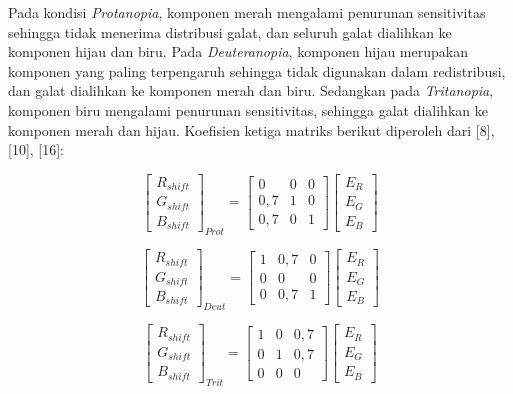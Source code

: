 Pada kondisi \textit{Protanopia}, komponen merah mengalami penurunan sensitivitas sehingga tidak menerima distribusi galat, dan seluruh galat dialihkan ke komponen hijau dan biru. Pada \textit{Deuteranopia}, komponen hijau merupakan komponen yang paling terpengaruh sehingga tidak digunakan dalam redistribusi, dan galat dialihkan ke komponen merah dan biru. Sedangkan pada \textit{Tritanopia}, komponen biru mengalami penurunan sensitivitas, sehingga galat dialihkan ke komponen merah dan hijau. Koefisien ketiga matriks berikut diperoleh dari [8], [10], [16]:

\begin{equation}
\begin{bmatrix} R_{shift} \\ G_{shift} \\ B_{shift} \end{bmatrix}_{Prot} =
\begin{bmatrix} 0 & 0 & 0 \\ 0{,}7 & 1 & 0 \\ 0{,}7 & 0 & 1 \end{bmatrix}
\begin{bmatrix} E_R \\ E_G \\ E_B \end{bmatrix}
\end{equation}

\begin{equation}
\begin{bmatrix} R_{shift} \\ G_{shift} \\ B_{shift} \end{bmatrix}_{Deut} =
\begin{bmatrix} 1 & 0{,}7 & 0 \\ 0 & 0 & 0 \\ 0 & 0{,}7 & 1 \end{bmatrix}
\begin{bmatrix} E_R \\ E_G \\ E_B \end{bmatrix}
\end{equation}

\begin{equation}
\begin{bmatrix} R_{shift} \\ G_{shift} \\ B_{shift} \end{bmatrix}_{Trit} =
\begin{bmatrix} 1 & 0 & 0{,}7 \\ 0 & 1 & 0{,}7 \\ 0 & 0 & 0 \end{bmatrix}
\begin{bmatrix} E_R \\ E_G \\ E_B \end{bmatrix}
\end{equation}

